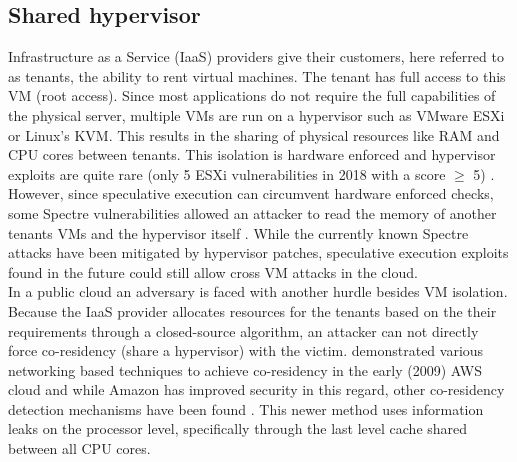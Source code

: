 \documentclass[conference,compsoc,final,a4paper]{IEEEtran}
\begin{document}
\subsection{Shared hypervisor}
Infrastructure as a Service (IaaS) providers give their customers, here referred to as tenants, the ability to rent virtual machines. The tenant has full access
to this VM (root access). Since most applications do not require the full capabilities of the physical server, multiple VMs are run on a hypervisor such as VMware
ESXi or Linux's KVM. This results in the sharing of physical resources like RAM and CPU cores between tenants. This isolation is hardware enforced
and hypervisor exploits are quite rare (only 5 ESXi vulnerabilities in 2018 with a score $\ge$ 5) \cite{esxiVulnerabilities}. However, since speculative execution can
circumvent hardware enforced checks, some Spectre vulnerabilities allowed an attacker to read the memory of another tenants VMs and the hypervisor
itself \cite{vmwareSpectre, vmwareSpectreNG}. While the currently known Spectre attacks have been mitigated by hypervisor patches, speculative execution exploits
found in the future could still allow cross VM attacks in the cloud. \\
In a public cloud an adversary is faced with another hurdle besides VM isolation. Because the IaaS provider allocates resources for the tenants based on the their
requirements through a closed-source algorithm, an attacker can not directly force co-residency (share a hypervisor) with the victim.
\textcite{Ristenpart:2009:HYG:1653662.1653687} demonstrated various networking based techniques to achieve co-residency in the early (2009) AWS cloud and while Amazon
has improved security in this regard, other co-residency detection mechanisms have been found \cite{inci2015seriously}. This newer method uses information leaks
on the processor level, specifically through the last level cache shared between all CPU cores.
\end{document}

